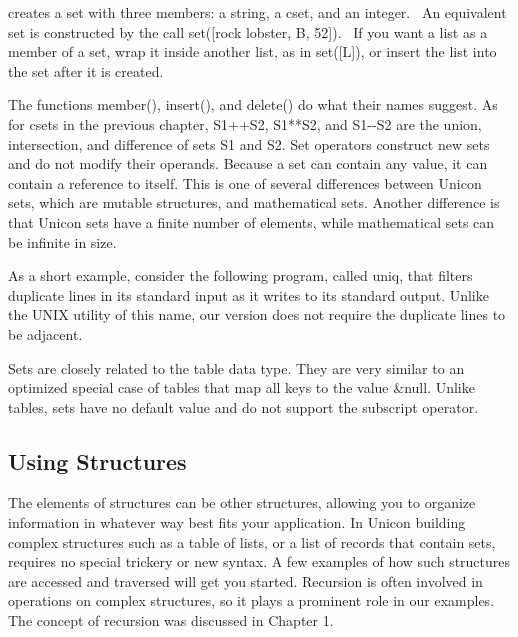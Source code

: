
\noindent
creates a set with three members: a string, a cset, and an integer. \ An
equivalent set is constructed by the call
\textsf{set([{\textquotedbl}rock lobster{\textquotedbl},
{\textquotesingle}B{\textquotesingle}, 52])}. \ If you want a list as a
member of a set, wrap it inside another list, as in \textsf{set([L])},
or insert the list into the set after it is created.

The functions \textsf{member()},
\textsf{insert()}, and
\textsf{delete()} do what their names suggest. As
for csets in the previous chapter, \textsf{S1++S2}, \textsf{S1**S2},
and \textsf{S1-{}-S2} are the union,
intersection, and difference of sets \textsf{S1} and \textsf{S2}. Set
operators construct new sets and do not modify their operands. Because
a set can contain any value, it can contain a
reference to itself. This is one of several
differences between Unicon sets, which are mutable structures, and
mathematical sets. Another difference is that Unicon sets have a finite
number of elements, while mathematical sets can be infinite in size.

As a short example, consider the following program, called
\textsf{uniq}, that filters duplicate lines in its standard input as it
writes to its standard output. Unlike the UNIX utility of this name,
our version does not require the duplicate lines to be adjacent.


Sets are closely related to the table data type. They are very similar
to an optimized special case of tables that map all keys to the value
\textsf{\&null}. Unlike tables, sets have no default value and do not
support the subscript operator.

\subsection{Using Structures}
The elements of structures can be other structures, allowing you to
organize information in whatever way best fits your application. In
Unicon building complex structures such as a table of lists, or a list
of records that contain sets, requires no special trickery or new
syntax. A few examples of how such structures are accessed and
traversed will get you started. Recursion is often
involved in operations on complex structures, so it plays a prominent
role in our examples. The concept of recursion was discussed in Chapter
1.

